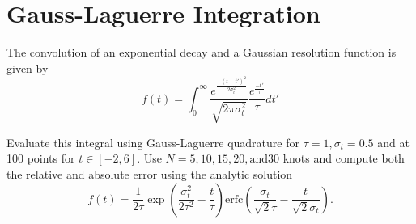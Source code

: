 \section{Gauss-Laguerre Integration}

The convolution of an exponential decay and a Gaussian resolution function is given by
\begin{equation}
    f(t)=\int^\infty_0 \frac{e^{\frac{-(t-t')^2}{2\sigma^2_t}}}{\sqrt{2\pi\sigma^2_t}}\frac{e^{\frac{-t'}{\tau}}}{\tau}dt'
\end{equation}

Evaluate this integral using Gauss-Laguerre quadrature for $\tau=1,\sigma_t=0.5$ and at 100 points for $t\in[-2,6]$. Use $N=5,10,15,20,\mathrm{and}30$ knots and compute both the relative and absolute
error using the analytic solution
\begin{equation}
    f(t)=\frac{1}{2\tau}\exp{\left(\frac{\sigma^2_t}{2\tau^2}-\frac{t}{\tau}\right)}\mathrm{erfc}\left(\frac{\sigma_t}{\sqrt{2}\tau}-\frac{t}{\sqrt{2}\sigma_t}\right).
\end{equation}

